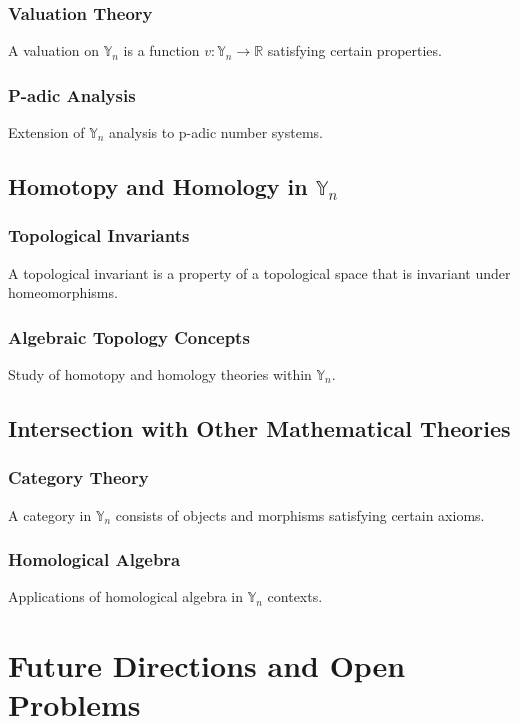 \documentclass[12pt]{book}
\begin{document}
\subsection{Valuation Theory}
\begin{definition}
A valuation on $\mathbb{Y}_n$ is a function $v: \mathbb{Y}_n \to \mathbb{R}$ satisfying certain properties.
\end{definition}
\subsection{P-adic Analysis}
Extension of $\mathbb{Y}_n$ analysis to p-adic number systems.

\section{Homotopy and Homology in $\mathbb{Y}_n$}
\subsection{Topological Invariants}
\begin{definition}
A topological invariant is a property of a topological space that is invariant under homeomorphisms.
\end{definition}
\subsection{Algebraic Topology Concepts}
Study of homotopy and homology theories within $\mathbb{Y}_n$.

\section{Intersection with Other Mathematical Theories}
\subsection{Category Theory}
\begin{definition}
A category in $\mathbb{Y}_n$ consists of objects and morphisms satisfying certain axioms.
\end{definition}
\subsection{Homological Algebra}
Applications of homological algebra in $\mathbb{Y}_n$ contexts.

\chapter{Future Directions and Open Problems}
\end{document}
